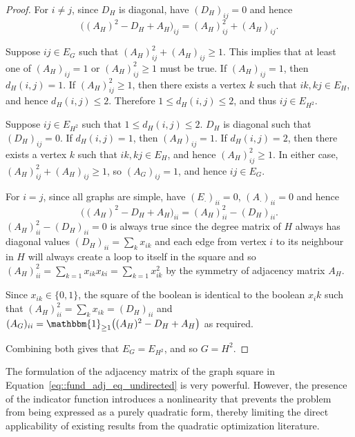 \documentclass[11pt]{article}
\begin{document}
\begin{proof} 
  For $i \neq j$, since $D_H$ is diagonal, have $(D_H)_{ij} = 0$ and hence
  \[
  \big((A_H)^2 - D_H + A_H\big)_{ij} = (A_H)^2_{ij} + (A_H)_{ij}.
  \]

  Suppose $ij \in E_G$ such that $(A_H)^2_{ij} + (A_H)_{ij} \geq 1$. This implies that at least one of $(A_H)_{ij} = 1$ or $(A_H)^2_{ij} \geq 1$ must be true. If $(A_H)_{ij} = 1$, then $d_H(i,j) = 1$.  If $(A_H)^2_{ij} \geq 1$, then there exists a vertex $k$ such that $ik, kj \in E_H$, and hence $d_H(i,j) \leq 2$. Therefore $1 \leq d_H(i,j) \leq 2$, and thus $ij \in E_{H^2}$.

  Suppose $ij \in E_{H^2}$ such that $1 \leq d_H(i,j) \leq 2$. $D_H$ is diagonal such that $(D_H)_{ij} = 0$. If $d_H(i,j) = 1$, then $(A_H)_{ij} = 1$. If $d_H(i,j) = 2$, then there exists a vertex $k$ such that $ik, kj \in E_H$, and hence $(A_H)^2_{ij} \geq 1$. In either case, $(A_H)^2_{ij} + (A_H)_{ij} \geq 1$, so $(A_G)_{ij} = 1$, and hence $ij \in E_G$.

  For $i = j$, since all graphs are simple, have $(E_{\cdot})_{ii} = 0$, $(A_{\cdot})_{ii} = 0$ and hence
  \[
  \big((A_H)^2 - D_H + A_H\big)_{ii} = (A_H)^2_{ii} - (D_H)_{ii}.
  \]
  $(A_H)^2_{ii} - (D_H)_{ii} = 0$ is always true since the degree matrix of $H$ always has diagonal values $\displaystyle (D_H)_{ii} = \sum_k x_{ik}$ and each edge from vertex $i$ to its neighbour in $H$ will always create a loop to itself in the square and so $\displaystyle (A_H)^2_{ii} = 
  \sum_{k = 1} x_{ik}x_{ki} = \sum_{k = 1} x_{ik}^2$ by the symmetry of adjacency matrix $A_H$. 
  
  Since $x_{ik} \in \{0, 1\}$, the square of the boolean is identical to the boolean $x_ik$ such that $\displaystyle (A_H)^2_{ii} = \sum_k x_{ik} = (D_H)_{ii}$ and $(A_G)_{ii} = \mathbbm{1}_{\geq 1}\big((A_H)^2 - D_H + A_H\big)$ as required. 

  Combining both gives that $E_G = E_{H^2}$, and so $G = H^2$.  
\end{proof}

The formulation of the adjacency matrix of the graph square in Equation~\eqref{eq::fund_adj_eq_undirected} is very powerful. However, the presence of the indicator function introduces a nonlinearity that prevents the problem from being expressed as a purely quadratic form, thereby limiting the direct applicability of existing results from the quadratic optimization literature.
\end{document}
